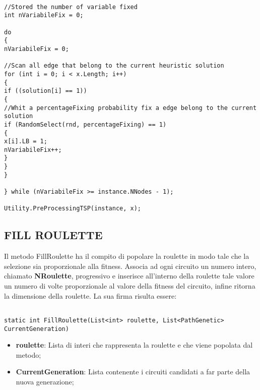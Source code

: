 \documentclass[11pt]{article}
\begin{document}
\begin{lstlisting}

//Stored the number of variable fixed
int nVariabileFix = 0;

do
{
nVariabileFix = 0;

//Scan all edge that belong to the current heuristic solution
for (int i = 0; i < x.Length; i++)
{
if ((solution[i] == 1))
{
//Whit a percentageFixing probability fix a edge belong to the current solution
if (RandomSelect(rnd, percentageFixing) == 1)
{
x[i].LB = 1;
nVariabileFix++;
}
}
}

} while (nVariabileFix >= instance.NNodes - 1);

Utility.PreProcessingTSP(instance, x);

\end{lstlisting}

\subsection*{FILL ROULETTE}

Il metodo FillRoulette ha il compito di popolare la roulette in modo tale che la selezione sia proporzionale alla fitness. Associa ad ogni circuito un numero intero, chiamato \textbf{NRoulette}, progressivo e inserisce all'interno della roulette tale valore un numero di volte proporzionale al valore della fitness del circuito, infine ritorna la dimensione della roulette. La sua firma risulta essere:

\begin{lstlisting}

static int FillRoulette(List<int> roulette, List<PathGenetic> CurrentGeneration)

\end{lstlisting}

\begin{itemize}
    \item \textbf{roulette}: Lista di interi che rappresenta la roulette e che viene popolata dal metodo;
    \item \textbf{CurrentGeneration}: Lista contenente i circuiti candidati a far parte della nuova generazione;
\end{itemize}
\end{document}
